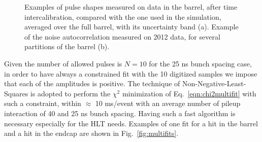 \documentclass[journal]{IEEEtran}
\begin{document}
%
\begin{figure}[!t]
  \begin{center}
    \caption{Examples of pulse shapes measured on data in the barrel, after time intercalibration, compared with the one used in the simulation, averaged over the full barrel, with its uncertainty band (a). Example of the noise autocorrelation measured on 2012 data, for several partitions of the barrel (b). \label{fig:pulse_shapes} }
  \end{center}
\end{figure}
%
Given the number of allowed pulses is $N=10$ for the 25 ns bunch spacing case, in order to have always a constrained fit with the 10 digitized samples we impose that each of the amplitudes is positive. The technique of Non-Negative-Least-Squares \cite{nnls} is adopted to perform the $\chi^2$ minimization of Eq.~\ref{eqn:chi2multifit} with such a constraint, within $\approx$ 10 ms/event with an average number of pileup interaction of 40 and 25 ns bunch spacing. Having such a fast algorithm is necessary especially for the HLT needs. Examples of one fit for a hit in the barrel and a hit in the endcap are shown in Fig.~\ref{fig:multifits}.
%
\end{document}
